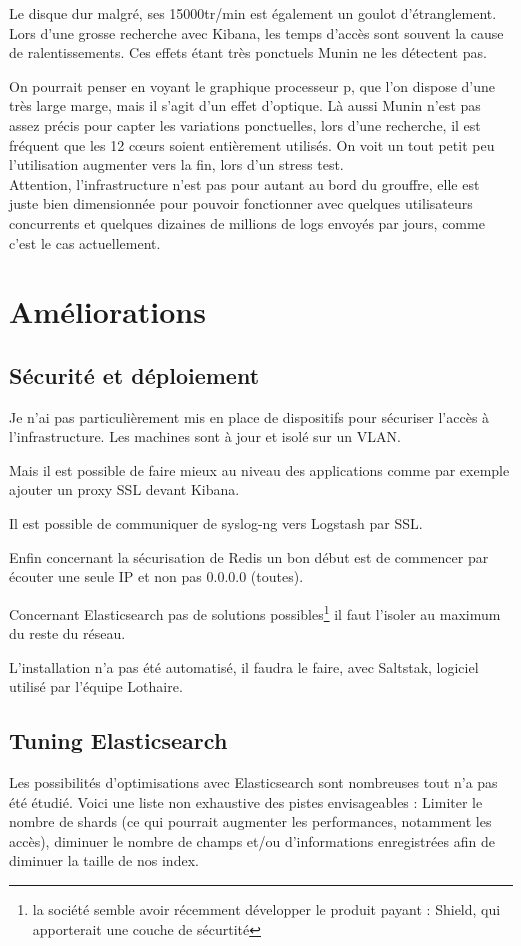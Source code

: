Le disque dur malgré, ses 15000tr/min est également un goulot d'étranglement. Lors
d'une grosse recherche avec Kibana, les temps d'accès sont souvent la cause de ralentissements.
Ces effets étant très ponctuels Munin ne les détectent pas.

On pourrait penser en voyant le graphique processeur p\pageref{fig:elk1cpu}, que 
l'on dispose d'une très large marge, mais il s'agit d'un effet d'optique. 
Là aussi Munin n'est pas assez précis pour capter les variations ponctuelles, 
lors d'une recherche, il est fréquent que les 12 cœurs soient entièrement utilisés.
On voit un tout petit peu l'utilisation augmenter vers la fin, lors d'un stress test.\\[3mm]

Attention, l'infrastructure n'est pas pour autant au bord du grouffre, elle est juste
bien dimensionnée pour pouvoir fonctionner avec quelques utilisateurs concurrents et
quelques dizaines de millions de \gls{logs} envoyés par jours, comme c'est le cas actuellement.


\section{Améliorations}
\subsection{Sécurité et déploiement}
Je n'ai pas particulièrement mis en place de dispositifs pour sécuriser 
l'accès à l'infrastructure. Les machines sont à jour et isolé sur un VLAN. 

Mais il est possible de faire mieux au niveau des applications comme par exemple 
ajouter un proxy SSL devant Kibana.

Il est possible de communiquer de syslog-ng vers Logstash par SSL.

Enfin concernant la sécurisation de Redis un bon début est de commencer par écouter 
une seule IP et non pas  0.0.0.0 (toutes).

Concernant Elasticsearch pas de solutions possibles\footnote{la société semble avoir récemment développer
le produit payant : Shield, qui apporterait une couche de sécurtité} il faut l'isoler au maximum du 
reste du réseau.

L'installation n'a pas été automatisé, il faudra le faire, avec Saltstak, logiciel
utilisé par l'équipe Lothaire.
\subsection{Tuning Elasticsearch}
Les possibilités d'optimisations avec Elasticsearch sont nombreuses tout n'a pas été
étudié. Voici une liste non exhaustive des pistes envisageables : Limiter le nombre de shards (ce qui pourrait
augmenter les performances, notamment les accès), diminuer le nombre de champs et/ou 
d'informations enregistrées afin de diminuer la taille de nos index.


